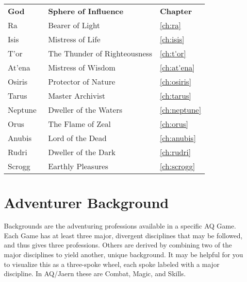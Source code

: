 \begin{normboxc}
\small
\begin{tabular}{@{}l l l}

\textbf{God} & \textbf{Sphere of Influence} & \textbf{Chapter}\\
Ra & Bearer of Light & \ref{ch:ra}\\
Isis\ & Mistress of Life & \ref{ch:isis}\\
T'or\ & The Thunder of Righteousness & \ref{ch:t'or}\\
At'ena\ & Mistress of Wisdom & \ref{ch:at'ena}\\
Osiris\ & Protector of Nature & \ref{ch:osiris}\\
Tarus\ & Master Archivist & \ref{ch:tarus}\\
Neptune\ & Dweller of the Waters & \ref{ch:neptune}\\
Orus\ & The Flame of Zeal & \ref{ch:orus}\\
Anubis\ & Lord of the Dead & \ref{ch:anubis}\\
Rudri\ & Dweller of the Dark & \ref{ch:rudri}\\
Scrogg\ & Earthly Pleasures & \ref{ch:scrogg}\\
\end{tabular}
\end{normboxc}
\normalsize

\section{Adventurer Background}
Backgrounds are the adventuring professions available in a specific AQ Game. Each Game has at least three major, divergent disciplines that may be followed, and thus gives three professions. Others are derived by combining two of the major disciplines to yield another, unique background. It may be helpful for you to visualize this as a three-spoke wheel, each spoke labeled with a major discipline. In AQ/Jaern these are Combat, Magic, and Skills.

